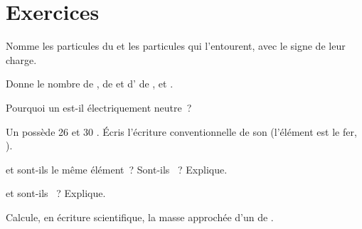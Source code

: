 \section{Exercices}

\begin{exercise}[$\star$]\label{exo:g9:inside-the-atom:1}
Nomme les particules du  et les particules qui l'entourent, avec le
signe de leur charge.
\end{exercise}

\begin{exercise}[$\star$]\label{exo:g9:inside-the-atom:2}
Donne le nombre de , de  et d' de
,  et .
\end{exercise}

\begin{exercise}[$\star$]\label{exo:g9:inside-the-atom:3}
Pourquoi un  est-il électriquement neutre~?
\end{exercise}

\begin{exercise}[$\star$]\label{exo:g9:inside-the-atom:4}
Un  possède 26  et 30 . Écris l'écriture
conventionnelle de son  (l'élément est le fer, ).
\end{exercise}

\begin{exercise}[$\star\star$]\label{exo:g9:inside-the-atom:5}
 et  sont-ils le même élément~?
Sont-ils ~? Explique.
\end{exercise}

\begin{exercise}[$\star\star$]\label{exo:g9:inside-the-atom:6}
 et  sont-ils ~? Explique.
\end{exercise}

\begin{exercise}[$\star\star$]\label{exo:g9:inside-the-atom:7}
Calcule, en écriture scientifique, la masse approchée d'un  de
.
\end{exercise}

